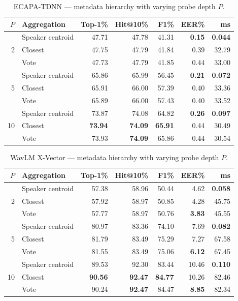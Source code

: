\documentclass[12pt, a4paper]{article}
\begin{document}
\begin{table}[H]
\centering
\caption{ECAPA-TDNN --- metadata hierarchy with varying probe depth $P$.}
\label{tab:probes_ecapa}
\setlength{\tabcolsep}{4pt}
\begin{tabular}{rlrrrrr}
\toprule
$P$ & \textbf{Aggregation} &
\textbf{Top-1\%} & \textbf{Hit@10\%} &
\textbf{F1\%} & \textbf{EER\%} & \textbf{ms} \\
\midrule
\multirow{3}{*}{2}
  & Speaker centroid & 47.71 & 47.78 & 41.31 & \textbf{0.15} & \textbf{0.044} \\
  & Closest          & 47.75 & 47.79 & 41.84 & 0.39 & 32.79 \\
  & Vote             & 47.73 & 47.79 & 41.85 & 0.44 & 33.00 \\
\midrule
\multirow{3}{*}{5}
  & Speaker centroid & 65.86 & 65.99 & 56.45 & \textbf{0.21} & \textbf{0.072} \\
  & Closest          & 65.91 & 66.00 & 57.39 & 0.40 & 33.36 \\
  & Vote             & 65.89 & 66.00 & 57.43 & 0.40 & 33.52 \\
\midrule
\multirow{3}{*}{10}
  & Speaker centroid & 73.87 & 74.08 & 64.82 & \textbf{0.26} & \textbf{0.097} \\
  & Closest          & \textbf{73.94} & \textbf{74.09} & \textbf{65.91} & 0.44 & 30.49 \\
  & Vote             & 73.93 & \textbf{74.09} & 65.86 & 0.44 & 30.54 \\
\bottomrule
\end{tabular}
\end{table}

\begin{table}[H]
\centering
\caption{WavLM X-Vector --- metadata hierarchy with varying probe depth $P$.}
\label{tab:probes_wavlm_xvec}
\setlength{\tabcolsep}{4pt}
\begin{tabular}{rlrrrrr}
\toprule
$P$ & \textbf{Aggregation} &
\textbf{Top-1\%} & \textbf{Hit@10\%} &
\textbf{F1\%} & \textbf{EER\%} & \textbf{ms} \\
\midrule
\multirow{3}{*}{2}
  & Speaker centroid & 57.38 & 58.96 & 50.44 & 4.62 & \textbf{0.058} \\
  & Closest          & 57.92 & 58.97 & 50.85 & 4.28 & 45.75 \\
  & Vote             & 57.77 & 58.97 & 50.76 & \textbf{3.83} & 45.55 \\
\midrule
\multirow{3}{*}{5}
  & Speaker centroid & 80.97 & 83.36 & 74.10 & 7.69 & \textbf{0.082} \\
  & Closest          & 81.79 & 83.49 & 75.29 & 7.27 & 67.58 \\
  & Vote             & 81.55 & 83.49 & 75.06 & \textbf{6.12} & 67.45 \\
\midrule
\multirow{3}{*}{10}
  & Speaker centroid & 89.53 & 92.30 & 83.44 & 10.46 & \textbf{0.110} \\
  & Closest          & \textbf{90.56} & \textbf{92.47} & \textbf{84.77} & 10.26 & 82.46 \\
  & Vote             & 90.24 & \textbf{92.47} & 84.47 & \textbf{8.85} & 82.34 \\
\bottomrule
\end{tabular}
\end{table}
\end{document}
